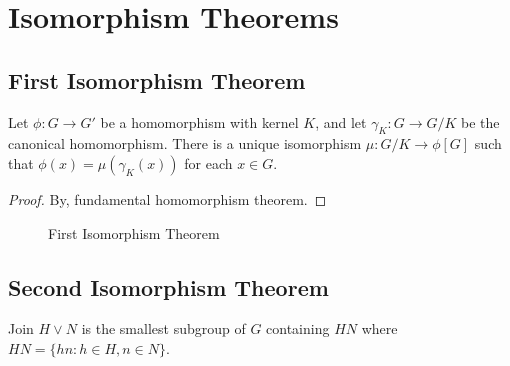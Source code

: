 \section{Isomorphism Theorems}
\subsection{First Isomorphism Theorem}
\begin{theorem}
	Let $\phi : G \to G'$ be a homomorphism with kernel $K$, and let $\gamma_K : G \to G/K$ be the canonical homomorphism.
	There is a unique isomorphism $\mu : G/K \to \phi[G]$ such that $\phi(x) = \mu(\gamma_K(x))$ for each $x \in G$.
\end{theorem}
\begin{proof}
	By, fundamental homomorphism theorem.\cite[\S14.1]{fraleigh}
\end{proof}
\begin{figure}[h]
	\centering
	\caption{First Isomorphism Theorem}
\end{figure}

\subsection{Second Isomorphism Theorem}
\begin{definition}

	Join $H \vee N$ is the smallest subgroup of $G$ containing $HN$ where $HN = \{ hn : h \in H, n \in N\}$.
\end{definition}

